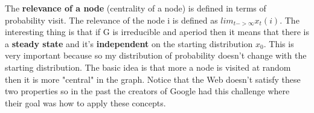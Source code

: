 The \textbf{relevance of a node} (centrality of a node) is defined in terms of probability visit. The relevance of the node i is defined as $lim_{t->\infty}x_t(i)$.\newline
The interesting thing is that if G is irreducible and aperiod then it means that there is a \textbf{steady state} and it's \textbf{independent} on the starting distribution $x_0$. This is very important because so my distribution of probability doesn't change with the starting distribution.\newline
The basic idea is that more a node is visited at random then it is more "central" in the graph.\newline
Notice that the Web doesn't satisfy these two properties so in the past the creators of Google had this challenge where their goal was how to apply these concepts.\newline
